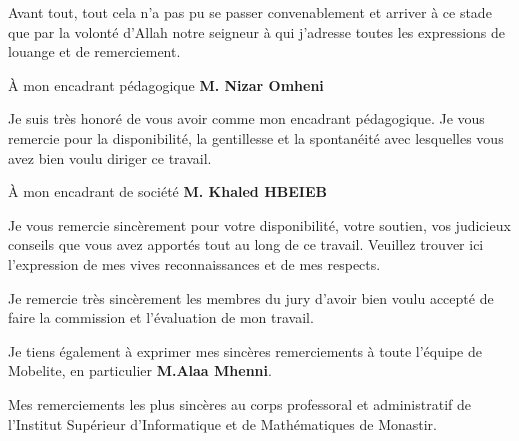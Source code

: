Avant tout, tout cela n'a pas pu se passer convenablement et arriver à ce stade que par la volonté d'Allah notre seigneur à qui j'adresse toutes les expressions de louange et de remerciement.

\vspace{1em}

{\large À mon encadrant pédagogique \textbf{M. Nizar Omheni}}

\vspace{0.5em}

Je suis très honoré de vous avoir comme mon encadrant pédagogique. Je vous remercie pour la disponibilité, la gentillesse et la spontanéité avec lesquelles vous avez bien voulu diriger ce travail.

\vspace{1em}

{\large À mon encadrant de société \textbf{M. Khaled HBEIEB}}

\vspace{0.5em}

Je vous remercie sincèrement pour votre disponibilité, votre soutien, vos judicieux conseils que vous avez apportés tout au long de ce travail. Veuillez trouver ici l'expression de mes vives reconnaissances et de mes respects.

\vspace{1em}

Je remercie très sincèrement les membres du jury d'avoir bien voulu accepté de faire la commission et l'évaluation de mon travail.

\vspace{1em}

Je tiens également à exprimer mes sincères remerciements à toute l'équipe de Mobelite, en particulier \textbf{M.Alaa Mhenni}.

\vspace{1em}

Mes remerciements les plus sincères au corps professoral et administratif de l'Institut Supérieur d'Informatique et de Mathématiques de Monastir.